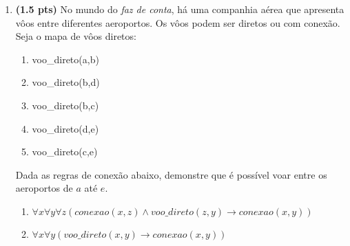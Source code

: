 \documentclass[11pt, a4paper,final]{article}
\begin{document}
\begin{enumerate}
\begin{enumerate}
\end{enumerate}

\begin{comment}
\item {\bf (1.5 pts)} Considere o seguinte conjunto de f\'ormulas: 

\begin{tabular}{ll}
1 &  $\forall x\forall y (q(x,y) \wedge r(y) \rightarrow p(y)) $ \\
2 &  $\forall x (q(x,x) \rightarrow p(x))  $ \\
3 &  $\forall x (s(x) \rightarrow q(x,x)) $ \\
4 &  $r(b)$ \\ 
5 &  $s(a)$ \\
6 &  $s(b)$ \\
\end{tabular}\\
Utilizando as propriedades da LPO, tais como PU, GU, GE e PE, detalhando passo-a-passo, verifique se há uma resposta para $\sim p(X)$ ou $p(X)$, 
consequentemente para $\sim p(a)$ ou $p(a)$ e $\sim p(b)$ ou $p(b)$.
O domínio é dado por $D=\{a,b\}$. 
\end{comment}

\item {\bf (1.5 pts)} No mundo do {\em faz de conta}, há uma
companhia aérea que apresenta vôos entre diferentes
aeroportos. Os vôos podem ser diretos ou com conexão.
Seja o mapa de vôos diretos:
\begin{enumerate}
\setlength{\itemsep}{-2pt}
    \item voo\_direto(a,b)
    \item voo\_direto(b,d)
    \item voo\_direto(b,c)
    \item voo\_direto(d,e)
    \item voo\_direto(c,e)
\end{enumerate}
\newpage
Dada as regras de conexão abaixo, demonstre que é possível
voar entre os aeroportos de $a$ até $e$.
\begin{enumerate}
\setlength{\itemsep}{-2pt}
  \item  $\forall x \forall y \forall z ( conexao(x,z) \wedge voo\_direto(z,y) \rightarrow  conexao(x,y) )$
\item $\forall x \forall y (voo\_direto(x,y)  \rightarrow  conexao(x,y) )$
\end{enumerate}



\end{enumerate}
\end{document}
